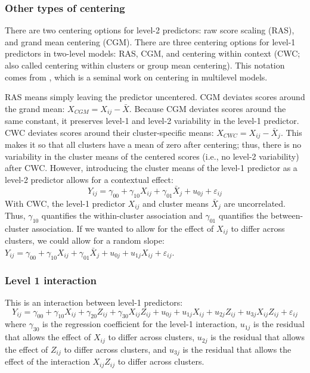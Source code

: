\subsubsection{Other types of centering}
There are two centering options for level-2 predictors: raw score scaling (RAS), and grand mean centering (CGM). There are three centering options for level-1 predictors in two-level models: RAS, CGM, and centering within context (CWC; also called centering within clusters or group mean centering). This notation comes from \cite{kreft1995effect}, which is a seminal work on centering in multilevel models. 

RAS means simply leaving the predictor uncentered. CGM deviates scores around the grand mean: $X_{CGM} = X_{ij} - \bar{X}$. Because CGM deviates scores around the same constant, it preserves level-1 and level-2 variability in the level-1 predictor. CWC deviates scores around their cluster-specific means: $X_{CWC} = X_{ij} - \bar{X}_j$. This makes it so that all clusters have a mean of zero after centering; thus, there is no variability in the cluster means of the centered scores (i.e., no level-2 variability) after CWC. However, introducing the cluster means of the level-1 predictor as a level-2 predictor allows for a contextual effect: 
\begin{equation}
    Y_{ij} = \gamma_{00} + \gamma_{10} X_{ij} + \gamma_{01} \bar{X}_j + u_{0j} + \varepsilon_{ij}
\end{equation}
With CWC, the level-1 predictor $X_{ij}$ and cluster means $\bar{X}_j$ are uncorrelated. Thus, $\gamma_{10}$ quantifies the within-cluster association and $\gamma_{01}$ quantifies the between-cluster association. If we wanted to allow for the effect of $X_{ij}$ to differ across clusters, we could allow for a random slope: $Y_{ij} = \gamma_{00} + \gamma_{10} X_{ij} + \gamma_{01} \bar{X}_j + u_{0j} + u_{1j} X_{ij} + \varepsilon_{ij}$. 

\subsubsection{Level 1 interaction}
This is an interaction between level-1 predictors:
\begin{equation}
    Y_{ij} = \gamma_{00} + \gamma_{10} X_{ij} + \gamma_{20} Z_{ij} + \gamma_{30} X_{ij} Z_{ij} + u_{0j} + u_{1j} X_{ij} + u_{2j} Z_{ij} + u_{3j} X_{ij} Z_{ij} + \varepsilon_{ij}
\end{equation}
where $\gamma_{30}$ is the regression coefficient for the level-1 interaction, $u_{1j}$ is the residual that allows the effect of $X_{ij}$ to differ across clusters, $u_{2j}$ is the residual that allows the effect of $Z_{ij}$ to differ across clusters, and $u_{3j}$ is the residual that allows the effect of the interaction $X_{ij} Z_{ij}$ to differ across clusters.

